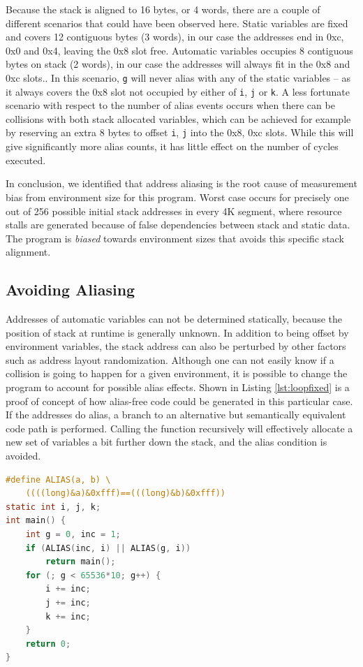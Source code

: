 \documentclass[a4paper,10pt,twocolumn,twoside]{article}
\begin{document}
Because the stack is aligned to 16 bytes, or 4 words, there are a couple of different scenarios that could have been observed here.
Static variables are fixed and covers 12 contiguous bytes (3 words), in our case the addresses end in 0xc, 0x0 and 0x4, leaving the 0x8 slot free.
Automatic variables occupies 8 contiguous bytes on stack (2 words), in our case the addresses will always fit in the 0x8 and 0xc slots..
In this scenario, \texttt{g} will never alias with any of the static variables -- as it always covers the 0x8 slot not occupied by either of \texttt{i}, \texttt{j} or \texttt{k}.
A less fortunate scenario with respect to the number of alias events occurs when there can be collisions with both stack allocated variables, which can be achieved for example by reserving an extra 8 bytes to offset \texttt{i}, \texttt{j} into the 0x8, 0xc slots. 
While this will give significantly more alias counts, it has little effect on the number of cycles executed.

In conclusion, we identified that address aliasing is the root cause of measurement bias from environment size for this program.
Worst case occurs for precisely one out of 256 possible initial stack addresses in every 4K segment, where resource stalls are generated because of false dependencies between stack and static data.
The program is \emph{biased} towards environment sizes that avoids this specific stack alignment.


\subsection{Avoiding Aliasing}
Addresses of automatic variables can not be determined statically, because the position of stack at runtime is generally unknown. 
In addition to being offset by environment variables, the stack address can also be perturbed by other factors such as address layout randomization. 
Although one can not easily know if a collision is going to happen for a given environment, it is possible to change the program to account for possible alias effects.
Shown in Listing \ref{lst:loopfixed} is a proof of concept of how alias-free code could be generated in this particular case.
If the addresses do alias, a branch to an alternative but semantically equivalent code path is performed.
Calling the function recursively will effectively allocate a new set of variables a bit further down the stack, and the alias condition is avoided.

\begin{lstlisting}[float=t, language=C, caption={Dynamically detect aliasing case, and avoid by pushing another stack frame.}, label={lst:loopfixed}, frame=lines]
#define ALIAS(a, b) \
    ((((long)&a)&0xfff)==(((long)&b)&0xfff))
static int i, j, k;
int main() {
    int g = 0, inc = 1;
    if (ALIAS(inc, i) || ALIAS(g, i))
        return main();
    for (; g < 65536*10; g++) {
        i += inc;
        j += inc;
        k += inc;
    }
    return 0;
}
\end{lstlisting}
\end{document}
